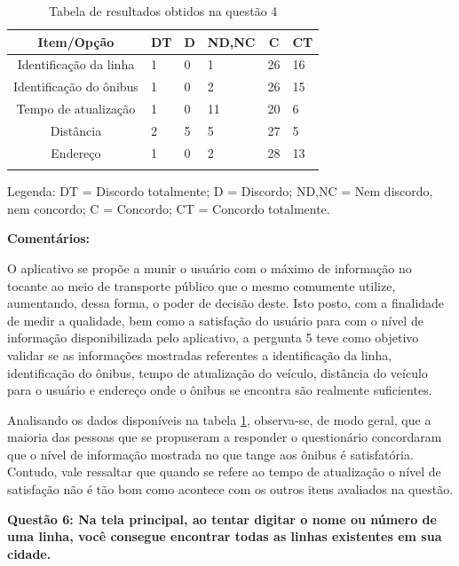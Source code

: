 \begin{center}
\begin{longtable}{c|p{1cm}|p{1cm}|p{2cm}|p{1cm}|p{1cm}}
\hline
    \multicolumn{1}{c}{\textbf{Item/Opção}} & \multicolumn{1}{c}{\textbf{DT}} & \multicolumn{1}{c}{\textbf{D}} & \multicolumn{1}{c}{\textbf{ND,NC}} & \multicolumn{1}{c}{\textbf{C}} & \multicolumn{1}{c}{\textbf{CT}} \\
\hline
    Identificação da linha & 1 & 0 & 1 & 26 & 16\\
    \hline
    Identificação do ônibus & 1 & 0 & 2 & 26 & 15\\
    \hline
     Tempo de atualização & 1 & 0 & 11 & 20 & 6\\
    \hline
    Distância & 2 & 5 & 5 & 27 & 5\\
    \hline
     Endereço & 1 & 0 & 2 & 28 & 13\\
     \hline
\caption{Tabela de resultados obtidos na questão 4}
\label{tabq5}
\end{longtable}
\end{center}

Legenda: DT = Discordo totalmente; D = Discordo; ND,NC = Nem discordo, nem concordo; C = Concordo; CT = Concordo totalmente.

\textbf{Comentários:}

O aplicativo se propõe a munir o usuário com o máximo de informação no tocante ao meio de transporte público que o mesmo comumente utilize, aumentando, dessa forma, o poder de decisão deste. Isto posto, com a finalidade de medir a qualidade, bem como a satisfação do usuário para com o nível de informação disponibilizada pelo aplicativo, a pergunta 5 teve como objetivo validar se as informações mostradas referentes a identificação da linha, identificação do ônibus, tempo de atualização do veículo, distância do veículo para o usuário e endereço onde o ônibus se encontra são realmente suficientes.
	
Analisando os dados disponíveis na tabela \ref{tabq5}, observa-se, de modo geral, que a maioria das pessoas que se propuseram a responder o questionário concordaram que o nível de informação mostrada no que tange aos ônibus é satisfatória. Contudo, vale ressaltar que quando se refere ao tempo de atualização o nível de satisfação não é tão bom como acontece com os outros itens avaliados na questão.\newline

\textbf{Questão 6: Na tela principal, ao tentar digitar o nome ou número de uma linha, você consegue encontrar todas as linhas existentes em sua cidade.}

